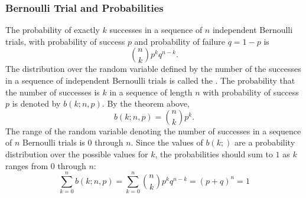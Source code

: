 \subsubsection*{Bernoulli Trial and Probabilities}
The probability of exactly $k$ successes in a sequence of $n$ independent Bernoulli trials, with probability of success $p$ and probability of failure $q=1-p$ is
\[
  \binom{n}{k}p^kq^{n-k}.
\]
The distribution over the random variable defined by the number of the successes in a sequence of independent Bernoulli trials is called the . The probability that the number of successes is $k$ in a sequence of length $n$ with probability of success $p$ is denoted by $b(k;n,p)$. By the theorem above,
\[
  b(k;n,p) = \binom{n}{k}p^k.
\]
The range of the random variable denoting the number of successes in a sequence of $n$ Bernoulli trials is 0 through $n$. Since the values of $b(k;)$ are a probability distribution over the possible values for $k$, the probabilities should sum to $1$ as $k$ ranges from $0$ through $n$:
\[
  \sum_{k=0}^{n} b(k;n,p) = \sum_{k=0}^{n} \binom{n}{k} p^kq^{n-k} = (p+q)^n = 1
\]